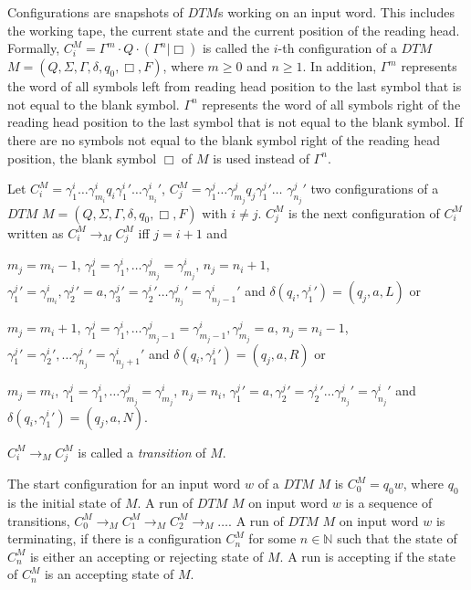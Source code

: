 Configurations are snapshots of $\mathit{DTM}$s working on an input word. This includes the working tape, the current
state and the current position of the reading head. Formally, $C_i^M = \Gamma^m \cdot Q \cdot (\Gamma^n | \Box)$
is called the $i$-th configuration of a $\mathit{DTM}$ $M = (Q, \Sigma, \Gamma, \delta, q_0, \Box, F)$, where $m \geq
0$ and $n \geq 1$. In addition, $\Gamma^m$ represents the word of all symbols left
from reading head position to the last symbol that is not equal to the blank symbol. $\Gamma^n$ represents the word
of all symbols right of the reading head position to the last symbol that is not equal to the blank symbol. If there
are no symbols not equal to the blank symbol right of the reading head position, the blank symbol $\Box$ of $M$ is used
instead of $\Gamma^n$.

\begin{definition}
    Let $C_i^M = \gamma_1^i\dots\gamma_{m_i}^i{q_i}{\gamma_1^i}'\dots{\gamma_{n_i}^i}'$, $C_j^M =
    \gamma_1^j\dots\gamma_{m_j}^j{q_j}{\gamma_1^j}'\dots$ ${\gamma_{n_j}^j}'$ two configurations of a $\mathit{DTM}$ $M
    = (Q, \Sigma, \Gamma, \delta, q_0, \Box, F)$ with $i \neq j$. $C_j^M$ is the next configuration of $C_i^M$
    written as $C_i^M \rightarrow_M C_j^M$ iff $j = i + 1$ and
    \begin{compactitem}
        \item $m_j = m_i - 1$, $\gamma_1^j = \gamma_1^i, \dots \gamma_{m_j}^j = \gamma_{m_j}^i$, $n_j = n_i + 1$,
        ${\gamma_1^j}' = \gamma_{m_i}^i, {\gamma_2^j}' = a, {\gamma_3^j}' = {\gamma_2^i}' \dots {\gamma_{n_j}^j}' =
        {\gamma_{{n_j}- 1}^i}'$ and $\delta(q_i, {\gamma_1^i}') = (q_j, a, L)$ or
        \item $m_j = m_i + 1$, $\gamma_1^j = \gamma_1^i, \dots \gamma_{m_j-1}^j = \gamma_{m_j-1}^i, \gamma_{m_j}^j
        = a$, $n_j = n_i - 1$, ${\gamma_1^j}' = {\gamma_2^i}', \dots {\gamma_{n_j}^j}' = {\gamma_{{n_j}+1}^i}'$ and
$\delta (q_i, {\gamma_1^i}') = (q_j, a, R)$ or
        \item $m_j = m_i$, $\gamma_1^j = \gamma_1^i, \dots \gamma_{m_j}^j = \gamma_{m_j}^i$, $n_j = n_i$, ${\gamma_1^j}'
= a, {\gamma_2^j}' = {\gamma_2^i}' \dots {\gamma_{n_j}^j}' = {\gamma_{n_j}^i}'$ and $\delta
        (q_i, {\gamma_1^i}') = (q_j, a, N)$.
    \end{compactitem}
    $C_i^M \rightarrow_M C_j^M$ is called a \emph{transition} of $M$.
\end{definition}

The start configuration for an input word $w$ of a $\mathit{DTM}$ $M$ is $C_0^M = q_0w$, where $q_0$ is the
initial state of $M$. A run of $\mathit{DTM}$ $M$ on input word $w$ is a sequence of transitions, $C_0^M
\rightarrow_M C_1^M \rightarrow_M C_2^M \rightarrow_M \dots$. A run of $\mathit{DTM}$ $M$ on input word $w$ is
terminating, if there is a configuration $C_n^M$ for some $n \in \mathbb{N}$ such that the state of $C_n^M$ is either
an accepting or rejecting state of $M$. A run is accepting if the state of $C_n^M$ is an accepting state of $M$.

